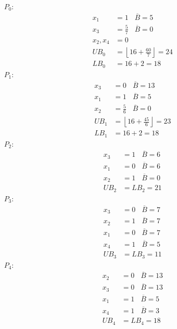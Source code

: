 $P_{0}$:
\begin{align*}
x_{1} & =1\ \ \ \ \overline{B} =5\\
x_{3} & =\frac{5}{7} \ \ \ \ \overline{B} =0\\
x_{2} ,x_{4} & =0\\
UB_{0} & =\left\lfloor 16+\frac{60}{7}\right\rfloor =24\\
LB_{0} & =16+2=18
\end{align*}
$P_{1}$:
\begin{align*}
x_{3} & =0\ \ \ \ \overline{B} =13\\
x_{1} & =1\ \ \ \ \overline{B} =5\\
x_{2} & =\frac{5}{6} \ \ \ \ \overline{B} =0\\
UB_{1} & =\left\lfloor 16+\frac{45}{6}\right\rfloor =23\\
LB_{1} & =16+2=18
\end{align*}
$P_{2}$:
\begin{align*}
x_{3} & =1\ \ \ \ \overline{B} =6\\
x_{1} & =0\ \ \ \ \overline{B} =6\\
x_{2} & =1\ \ \ \ \overline{B} =0\\
UB_{2} & =LB_{2} =21
\end{align*}
$P_{3}$:
\begin{align*}
x_{3} & =0\ \ \ \ \overline{B} =7\\
x_{2} & =1\ \ \ \ \overline{B} =7\\
x_{1} & =0\ \ \ \ \overline{B} =7\\
x_{4} & =1\ \ \ \ \overline{B} =5\\
UB_{3} & =LB_{3} =11
\end{align*}
$P_{4}$:
\begin{align*}
x_{2} & =0\ \ \ \ \overline{B} =13\\
x_{3} & =0\ \ \ \ \overline{B} =13\\
x_{1} & =1\ \ \ \ \overline{B} =5\\
x_{4} & =1\ \ \ \ \overline{B} =3\\
UB_{4} & =LB_{4} =18
\end{align*}
